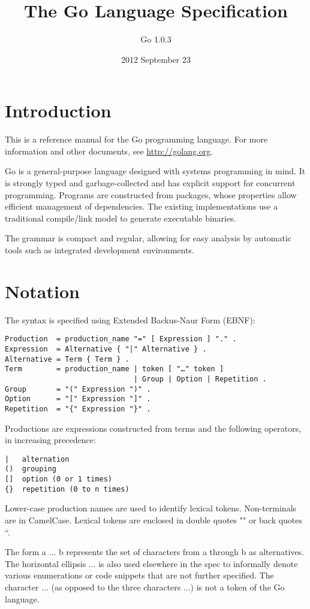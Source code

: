 \documentclass{article}
\title{The Go Language Specification}
\author{Go 1.0.3}
\date{2012 September 23}
\begin{document}
\maketitle

\section*{Introduction}
This is a reference manual for the Go programming language. For
more information and other documents, see \url{http://golang.org}.

Go is a general-purpose language designed with systems programming
in mind. It is strongly typed and garbage-collected and has explicit
support for concurrent programming. Programs are constructed from
packages, whose properties allow efficient management of dependencies.
The existing implementations use a traditional compile/link model
to generate executable binaries.

The grammar is compact and regular, allowing for easy analysis by
automatic tools such as integrated development environments.

\section*{Notation}

The syntax is specified using Extended Backus-Naur Form (EBNF):

\begin{Verbatim}[frame=single]
Production  = production_name "=" [ Expression ] "." .
Expression  = Alternative { "|" Alternative } .
Alternative = Term { Term } .
Term        = production_name | token [ "…" token ]
                              | Group | Option | Repetition .
Group       = "(" Expression ")" .
Option      = "[" Expression "]" .
Repetition  = "{" Expression "}" .
\end{Verbatim}

Productions are expressions constructed from terms and the following operators, in increasing precedence:

\begin{Verbatim}[frame=single]
|   alternation
()  grouping
[]  option (0 or 1 times)
{}  repetition (0 to n times)
\end{Verbatim}

Lower-case production names are used to identify lexical tokens.
Non-terminals are in CamelCase. Lexical tokens are enclosed in
double quotes "" or back quotes ``.

The form a $\ldots$ b represents the set of characters from a through b
as alternatives. The horizontal ellipsis $\ldots$ is also used elsewhere
in the spec to informally denote various enumerations or code
snippets that are not further specified. The character $\ldots$ (as opposed
to the three characters ...) is not a token of the Go language.
\end{document}
